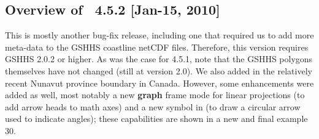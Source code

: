\subsection{Overview of \gmt\ 4.5.2 [Jan-15, 2010]}

This is mostly another bug-fix release, including one that required us to add more meta-data
to the GSHHS coastline netCDF files.  Therefore, this version requires GSHHS 2.0.2 or higher.
As was the case for 4.5.1, note that the GSHHS polygons themselves have not changed (still at version 2.0).
We also added in the relatively recent Nunavut province boundary in Canada.
However, some enhancements were added as well, most notably a new {\bf graph} frame mode for linear
projections (to add arrow heads to math axes) and a new symbol in  (to draw a
circular arrow used to indicate angles); these capabilities are shown in a new and final example 30.

